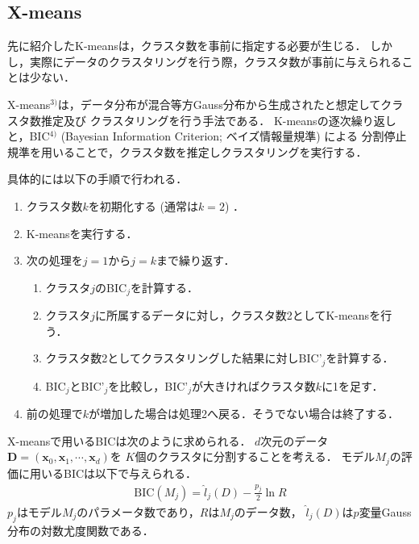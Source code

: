 \subsection{X-means}
先に紹介したK-meansは，クラスタ数を事前に指定する必要が生じる．
しかし，実際にデータのクラスタリングを行う際，クラスタ数が事前に与えられることは少ない．

X-means$^{3)}$は，データ分布が混合等方Gauss分布から生成されたと想定してクラスタ数推定及び
クラスタリングを行う手法である．
K-meansの逐次繰り返しと，BIC$^{4)}$ (Bayesian Information Criterion; ベイズ情報量規準) による
分割停止規準を用いることで，クラスタ数を推定しクラスタリングを実行する．

具体的には以下の手順で行われる．
\begin{enumerate}
    \item クラスタ数$k$を初期化する (通常は$k=2$) ．
    \item K-meansを実行する．
    \item 次の処理を$j=1$から$j=k$まで繰り返す．
    \begin{enumerate}
        \item クラスタ$j$のBIC$_j$を計算する．
        \item クラスタ$j$に所属するデータに対し，クラスタ数2としてK-meansを行う．
        \item クラスタ数2としてクラスタリングした結果に対しBIC'$_j$を計算する．
        \item BIC$_j$とBIC'$_j$を比較し，BIC'$_j$が大きければクラスタ数$k$に1を足す．
    \end{enumerate}
    \item 前の処理で$k$が増加した場合は処理2へ戻る．そうでない場合は終了する．
\end{enumerate}

X-meansで用いるBICは次のように求められる．
$d$次元のデータ${\bm D}=({\bm x_0}, {\bm x_1}, \cdots, {\bm x_d})$を
$K$個のクラスタに分割することを考える．
モデル$M_j$の評価に用いるBICは以下で与えられる．
\begin{align}
  \label{eq:bic}
  \mathrm{BIC}(M_j) = \hat{l}_j(D) - \frac{p_j}{2}\ln R
\end{align}
$p_j$はモデル$M_j$のパラメータ数であり，$R$は$M_j$のデータ数，
$\hat{l}_j(D)$は$p$変量Gauss分布の対数尤度関数である．

